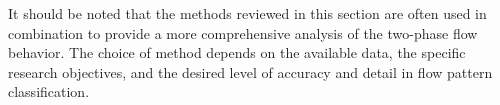 It should be noted that the methods reviewed in this section are often used in combination to provide a more comprehensive analysis of the two-phase flow behavior. The choice of method depends on the available data, the specific research objectives, and the desired level of accuracy and detail in flow pattern classification.